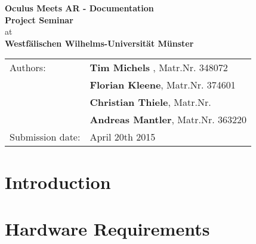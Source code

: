 



	\begin{center}
		\vspace*{54mm}
		{
			\renewcommand{\baselinestretch}{0.9}\normalsize
			\Large
			\textbf{Oculus Meets AR - Documentation}\\
		}
		\vspace*{15.5mm}
		{
			\large
			\textbf{Project Seminar}\\
		}
		\vspace*{10mm}
		{
			at\\
			\textbf{Westfälischen Wilhelms-Universität Münster}\\
		}
		\vspace*{100mm}
		\begin{tabular*}{137mm}{ll}
			Authors: 		& \textbf{Tim Michels }, Matr.Nr. 348072\\
						& \textbf{Florian Kleene}, Matr.Nr. 374601\\
						& \textbf{Christian Thiele}, Matr.Nr. \\
						& \textbf{Andreas Mantler}, Matr.Nr. 363220\\
			Submission date: 	& April 20th 2015
		\end{tabular*}
	\end{center}
	\newpage
	
	\thispagestyle{empty}\quad\newpage
	
	\thispagestyle{empty}
	\tableofcontents
	\vfill
	\newpage

	\thispagestyle{empty}\quad\newpage
	
	\setcounter{page}{1}
	\pagestyle{scrheadings}
	\setfootsepline{0pt} 
	\ihead[\chaptername\ \thechapter: \leftmark]{\chaptername\ \thechapter: \leftmark}
	\cfoot[\vspace*{9mm}\pagemark]{\vspace*{9mm}\pagemark}
	\renewcommand{\baselinestretch}{1.3}\normalsize

	\chapter{Introduction}
	\label{sec:introduction}
		

	\chapter{Hardware Requirements}
	\label{sec:hardware_requirements}
	
	
